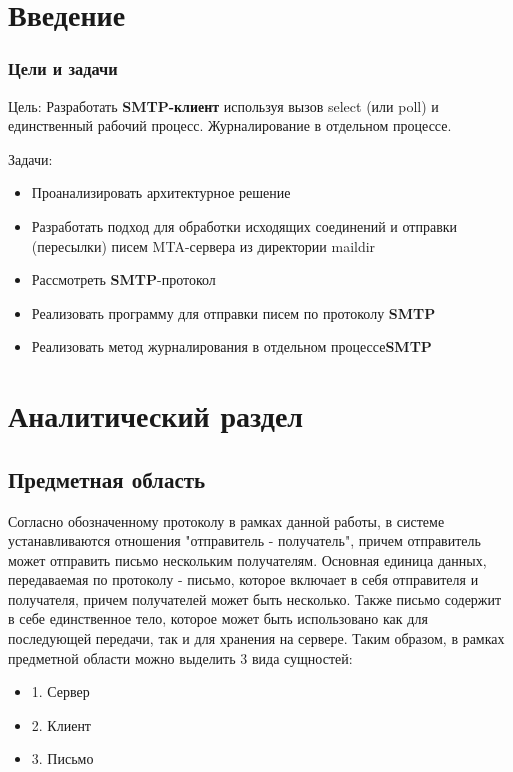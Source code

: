 \documentclass[a4paper,12pt]{report}
\begin{document}
\tableofcontents
\setcounter{page}{3} %
\chapter*{Введение}
\subsection{Цели и задачи}

Цель: 
    Разработать \textbf{SMTP-клиент} используя вызов select (или poll) и единственный рабочий процесс. Журналирование
    в отдельном процессе.

Задачи:
\begin{itemize}
    \item Проанализировать архитектурное решение
    \item Разработать подход для обработки исходящих соединений и отправки (пересылки) писем MTA-сервера из директории maildir
    \item Рассмотреть \textbf{SMTP}-протокол
    \item Реализовать программу для отправки писем по протоколу \textbf{SMTP}
    \item Реализовать метод журналирования в отдельном процессе\textbf{SMTP}
\end{itemize}

\chapter{Аналитический раздел}

\section*{Предметная область}
Согласно обозначенному протоколу в рамках данной работы, в системе устанавливаются отношения "отправитель - получатель", причем отправитель может отправить письмо нескольким получателям.
Основная единица данных, передаваемая по протоколу - письмо, которое включает в себя отправителя и получателя, причем получателей может быть несколько.
Также письмо содержит в себе единственное тело, которое может быть использовано как для последующей передачи, так и для хранения на сервере.
Таким образом, в рамках предметной области можно выделить 3 вида сущностей:
\begin{itemize}
    \item 1. Сервер
    \item 2. Клиент
    \item 3. Письмо
\end{itemize}
\end{document}
